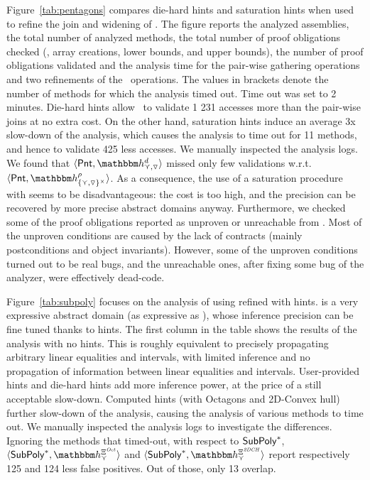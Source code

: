 \documentclass{llncs}
\begin{document}
Figure~\ref{tab:pentagons} compares die-hard hints and saturation
hints when used to refine the join and  widening of \Pentagons.
The figure reports the analyzed assemblies, the total number of analyzed methods, the total number of proof obligations checked (\ie, array creations, lower bounds, and upper bounds), the number of proof obligations validated and the analysis time for the pair-wise gathering operations and two refinements of the \Pentagons\ operations.
The values in brackets denote the number of methods for which the analysis timed out. 
Time out was set to 2 minutes.
Die-hard hints allow \Clousot\ to validate 1 231 accesses more than the pair-wise joins at no extra cost.
On the other hand, saturation hints induce an average 3x slow-down of the analysis, which causes the analysis to time out for 11 methods, and hence to validate 425 less accesses.
We manually inspected the analysis logs. 
We found that  $\tupla{\Pentagons, \hint{\cjoin,\widening}^{d}}$ missed only few validations w.r.t. $\tupla{\Pentagons{}, \hint{\{\cjoin, \widening\} ^\times}^{\rho}}$.
As a consequence, the use of a saturation procedure with \Pentagons{} seems to be disadvantageous: the cost is too high, and the precision can be recovered by more precise abstract domains anyway.
Furthermore, we checked some of the proof obligations reported as unproven or unreachable from \Clousot.
Most of the unproven conditions are caused by the lack of contracts (mainly postconditions and object invariants).
However, some of the unproven conditions turned out to be real bugs, and the unreachable ones, after fixing some bug of the analyzer, were effectively dead-code.


Figure~\ref{tab:subpoly} focuses on the analysis of  using \Subpoly{} refined with hints.
\Subpoly{} is a very expressive abstract domain (as expressive as \Polyhedra), whose inference precision can be fine tuned thanks to hints.
The first column in the table shows the results of the analysis  with no hints.
This is roughly equivalent to precisely propagating arbitrary linear equalities and intervals, with limited inference and no propagation of information between linear equalities and intervals. 
User-provided hints and die-hard hints add more inference power, at the price of a still acceptable slow-down.
Computed hints (with Octagons and 2D-Convex hull) further slow-down of the analysis, causing the analysis of various methods to time out.
We manually inspected the analysis logs to investigate the differences.
Ignoring the methods that timed-out, with respect to $\mathsf{SubPoly}^*$, $\tupla{\Subpoly^*, \hint{\cjoin}^{\hintcomp^\mathit{Oct}} }$ and  $\tupla{\Subpoly^*,  \hint{\cjoin}^{\hintcomp^\mathit{2DCH}}}$ report respectively 125 and  124 less false positives. 
Out of those, only 13 overlap.
\end{document}
